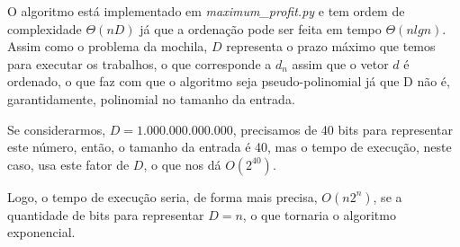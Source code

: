 O algoritmo está implementado em \textit{maximum\_profit.py} e tem ordem de complexidade $\Theta(nD)$ já que a ordenação pode ser feita em tempo $\Theta(nlgn)$. Assim como o problema da mochila, $D$ representa o prazo máximo que temos para executar os trabalhos, o que corresponde a $d_n$ assim que o vetor $d$ é ordenado, o que faz com que o algoritmo seja pseudo-polinomial já que D não é, garantidamente, polinomial no tamanho da entrada.

Se considerarmos, $D = 1.000.000.000.000$, precisamos de 40 bits para representar este número, então, o tamanho da entrada é 40, mas o tempo de execução, neste caso, usa este fator de $D$, o que nos dá $O(2^{40})$.

Logo, o tempo de execução seria, de forma mais precisa, $O(n2^n)$, se a quantidade de bits para representar $D = n$, o que tornaria o algoritmo exponencial.\\[12pt]